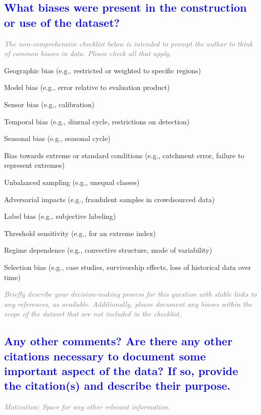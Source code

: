 \documentclass[letterpaper, 10 pt, transmag]{IEEEtran}
\begin{document}
\textcolor{blue}{\subsection{What biases were present in the construction or use of the dataset?}}
\textcolor{gray}{\textit{The non-comprehensive checklist below is intended to prompt the author to think of common biases in data. Please check all that apply.}}

\begin{todolist}
    \item Geographic bias (e.g., restricted or weighted to specific regions)
    \item Model bias (e.g., error relative to evaluation product)
    \item Sensor bias (e.g., calibration)
    \item Temporal bias (e.g., diurnal cycle, restrictions on detection)
    \item Seasonal bias (e.g., seasonal cycle)
    \item Bias towards extreme or standard conditions (e.g., catchment error, failure to represent extremes)
    \item Unbalanced sampling (e.g., unequal classes)
    \item Adversarial impacts (e.g., fraudulent samples in crowdsourced data)
    \item Label bias (e.g., subjective labeling)
    \item Threshold sensitivity (e.g., for an extreme index)
    \item Regime dependence (e.g., convective structure, mode of variability)
    \item Selection bias (e.g., case studies, survivorship effects, loss of historical data over time)
\end{todolist}

\textcolor{gray}{\textit{Briefly describe your decision-making process for this question with stable links to any references, as available. Additionally, please document any biases within the scope of the dataset that are not included in the checklist.}}

\textcolor{blue}{\subsection{Any other comments? Are there any other citations necessary to document some important aspect of the data? If so, provide the citation(s) and describe their purpose.}}
\textcolor{gray}{\textit{Motivation: Space for any other relevant information.}}


\bigskip
 
  

\end{document}

